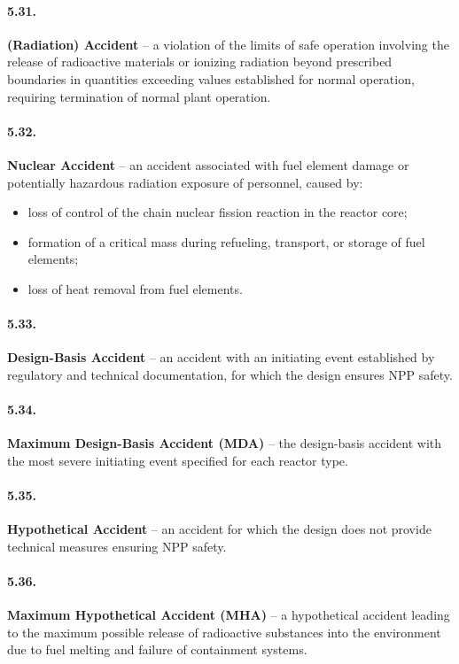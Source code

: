 \documentclass[openright]{bookest}
\begin{document}
\paragraph{5.31.}
\textbf{(Radiation) Accident} -- a violation of the limits of safe operation involving the release of radioactive materials or ionizing radiation beyond prescribed boundaries in quantities exceeding values established for normal operation, requiring termination of normal plant operation.

\paragraph{5.32.}
\textbf{Nuclear Accident} -- an accident associated with fuel element damage or potentially hazardous radiation exposure of personnel, caused by:
\begin{itemize}
    \item loss of control of the chain nuclear fission reaction in the reactor core;
    \item formation of a critical mass during refueling, transport, or storage of fuel elements;
    \item loss of heat removal from fuel elements.
\end{itemize}

\paragraph{5.33.}
\textbf{Design-Basis Accident} -- an accident with an initiating event established by regulatory and technical documentation, for which the design ensures NPP safety.

\paragraph{5.34.}
\textbf{Maximum Design-Basis Accident (MDA)} -- the design-basis accident with the most severe initiating event specified for each reactor type.

\paragraph{5.35.}
\textbf{Hypothetical Accident} -- an accident for which the design does not provide technical measures ensuring NPP safety.

\paragraph{5.36.}
\textbf{Maximum Hypothetical Accident (MHA)} -- a hypothetical accident leading to the maximum possible release of radioactive substances into the environment due to fuel melting and failure of containment systems.
\end{document}
